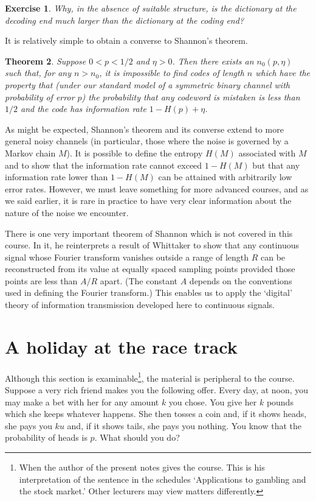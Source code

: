 \documentclass[12pt,a4paper]{article}
\theoremstyle{plain}
\newtheorem{theorem}{Theorem}[section]
\newtheorem{exercise}[theorem]{Exercise}
\theoremstyle{definition}
\begin{document}
\begin{exercise} Why, in the absence of suitable
structure, 
is the dictionary at the decoding
end much larger than the dictionary at the
coding end?
\end{exercise}

It is relatively simple to obtain a converse
to Shannon's theorem.
\begin{theorem}\label{T;Shannon converse}
Suppose $0<p<1/2$ and $\eta>0$.
Then there exists an $n_{0}(p,\eta)$ such that,
for any $n>n_{0}$, it is impossible
to find codes of
length $n$ which have the property
that (under our standard model
of  a symmetric binary
channel with probability of error $p$) the probability
that any codeword is mistaken is less than
$1/2$ and the code has
information rate $1-H(p)+\eta$.
\end{theorem}

As might be expected, Shannon's theorem 
and its converse extend
to more general noisy channels (in particular,  those 
where the noise is governed by a Markov chain $M$).
It is possible to define the entropy $H(M)$ 
associated with $M$
and to show that the information
rate cannot exceed $1-H(M)$ but that any
information rate lower than $1-H(M)$ can 
be attained with arbitrarily low error rates.
However, we must leave something for more
advanced courses, and as we said earlier, 
it is rare in practice to have very clear 
information about the nature of the noise 
we encounter.

There is one very important theorem of Shannon
which is not covered in this course. In it, he reinterprets
a result of Whittaker to show that any continuous signal 
whose Fourier transform vanishes outside a range of length
$R$ can be
reconstructed from its value at equally spaced
sampling points provided those points are less than $A/R$
apart. (The constant $A$ depends on the conventions used
in defining the Fourier transform.) This enables us
to apply the `digital' theory of information transmission
developed here to continuous signals.
\section{A holiday at the race track}\label{S;race track}
Although this section is examinable\footnote{When the
author of the present notes gives the course.
This is his interpretation of the sentence in the schedules
`Applications to gambling and the stock market.'
Other lecturers may view matters differently.},
the material is peripheral to the course.
Suppose a very rich friend makes you the following
offer. Every day, at noon, you may make a bet with her
for any amount $k$ you chose. You give her $k$
pounds which she keeps whatever happens.
She then tosses a coin
and, if it shows heads, she pays you $ku$
and, if it shows tails, she pays you nothing.
You know that the probability
of heads is $p$.
What should you do?
\end{document}

